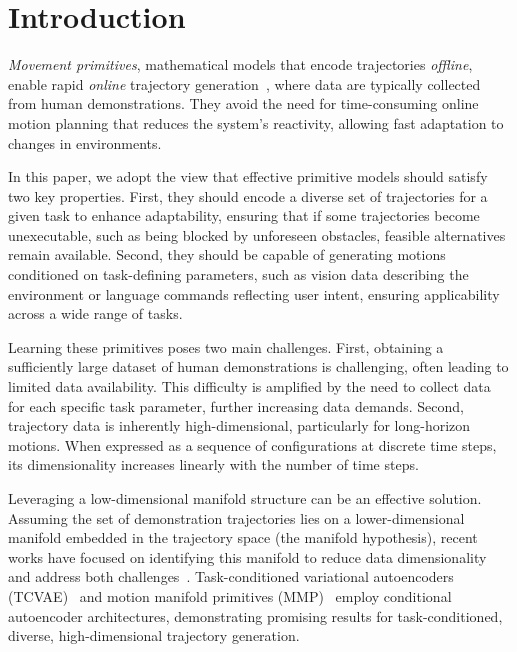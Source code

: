 \section{Introduction}
{\it Movement primitives}, mathematical models that encode trajectories {\it offline}, enable rapid {\it online} trajectory generation~\cite{park2008movement, paraschos2013probabilistic, khansari2011learning, noseworthy2020task, lee2023equivariant, lee2024mmp++}, where data are typically collected from human demonstrations. They avoid the need for time-consuming online motion planning that reduces the system's reactivity, allowing fast adaptation to changes in environments. 

In this paper, we adopt the view that effective primitive models should satisfy two key properties. First, they should encode a diverse set of trajectories for a given task to enhance adaptability, ensuring that if some trajectories become unexecutable, such as being blocked by unforeseen obstacles, feasible alternatives remain available. Second, they should be capable of generating motions conditioned on task-defining parameters, such as vision data describing the environment or language commands reflecting user intent, ensuring applicability across a wide range of tasks.

Learning these primitives poses two main challenges.
First, obtaining a sufficiently large dataset of human demonstrations is challenging, often leading to limited data availability. This difficulty is amplified by the need to collect data for each specific task parameter, further increasing data demands.
Second, trajectory data is inherently high-dimensional, particularly for long-horizon motions. When expressed as a sequence of configurations at discrete time steps, its dimensionality increases linearly with the number of time steps.


Leveraging a low-dimensional manifold structure can be an effective solution. Assuming the set of demonstration trajectories lies on a lower-dimensional manifold embedded in the trajectory space (the manifold hypothesis), recent works have focused on identifying this manifold to reduce data dimensionality and address both challenges~\cite{noseworthy2020task, lee2023equivariant}. Task-conditioned variational autoencoders (TCVAE)~\cite{noseworthy2020task} and motion manifold primitives (MMP)~\cite{lee2023equivariant} employ conditional autoencoder architectures, demonstrating promising results for task-conditioned, diverse, high-dimensional trajectory generation.

